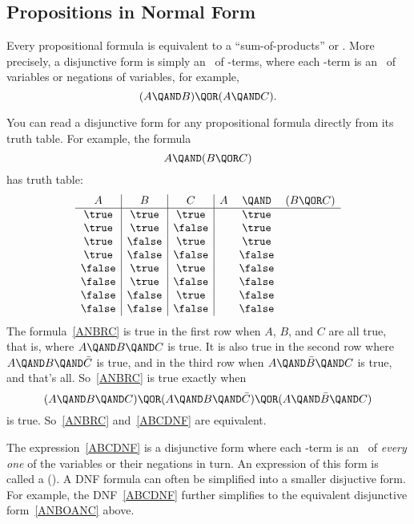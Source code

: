 \subsection{Propositions in Normal Form}
Every propositional formula is equivalent to a ``sum-of-products''
or .  More precisely, a disjunctive form is
simply an \QOR\ of \QAND-terms, where each \QAND-term is an \QAND\ of
variables or negations of variables, for example, 
\begin{equation}\label{ANBOANC}
(A \QAND B) \QOR (A \QAND C).
\end{equation}

You can read a disjunctive form for any propositional formula directly
from its truth table.  For example, the formula
\begin{equation}\label{ANBRC}
A \QAND (B \QOR C)
\end{equation}
has truth table:
\[\begin{array}{c|c|c|ccc}
A      & B      & C       & A & \QAND & (B \QOR C)\label{ANBRCTT}\\
\hline \true  & \true  & \true   &   &  \true\\
\true  & \true  & \false  &   &  \true\\
\true  & \false & \true   &   &  \true\\
\true  & \false & \false  &   &  \false\\
\false & \true  & \true   &   &  \false\\
\false & \true  & \false  &   &  \false\\
\false & \false & \true   &   &  \false\\
\false & \false & \false  &   &  \false
\end{array}\]
The formula~\eqref{ANBRC} is true in the first row when $A$, $B$, and
$C$ are all true, that is, where $A \QAND B \QAND C$ is true.  It is
also true in the second row where $A \QAND B \QAND \bar{C}$ is true,
and in the third row when $A \QAND \bar{B} \QAND C$ is true, and
that's all.  So~\eqref{ANBRC} is true exactly when
\begin{equation}\label{ABCDNF}
(A \QAND B \QAND C) \QOR (A \QAND B \QAND \bar{C}) \QOR
  (A \QAND \bar{B} \QAND C)
\end{equation}
is true.  So~\eqref{ANBRC} and~\eqref{ABCDNF} are equivalent.

The expression~\eqref{ABCDNF} is a disjunctive form where each
\QAND-term is an \QAND\ of \emph{every one} of the variables or
their negations in turn.  An expression of this form is called
a  ().  A DNF formula can
often be simplified into a smaller disjuctive form.  For example, the
DNF~\eqref{ABCDNF} further simplifies to the equivalent disjunctive
form~\eqref{ANBOANC} above.

